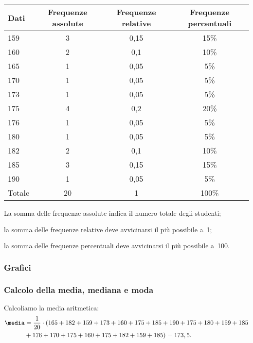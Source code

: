 \begin{esempio}
\begin{center}
\begin{tabular}{lccc}
\toprule
Dati & Frequenze assolute & Frequenze relative & Frequenze percentuali\\
\midrule
159 & 3 & 0,15 & 15\% \\
160 & 2 & 0,1 & 10\% \\
165 & 1 & 0,05 & 5\% \\
170 & 1 & 0,05 & 5\% \\
173 & 1 & 0,05 & 5\% \\
175 & 4 & 0,2 & 20\% \\
176 & 1 & 0,05 & 5\% \\
180 & 1 & 0,05 & 5\% \\
182 & 2 & 0,1 & 10\% \\
185 & 3 & 0,15 & 15\% \\
190 & 1 & 0,05 & 5\% \\
\midrule
Totale & 20 & 1 & 100\% \\
\bottomrule
\end{tabular}
\end{center}
\begin{itemize*}
\item La somma delle frequenze assolute indica il numero totale degli 
studenti;
\item la somma delle frequenze relative deve avvicinarsi il più possibile 
a~1;
\item la somma delle frequenze percentuali deve avvicinarsi il più 
possibile a~100.
\end{itemize*}
\vspace{-24pt}
\subsubsection{Grafici}
\begin{center}
 
\end{center}

\vspace{-24pt}
\subsubsection{Calcolo della media, mediana e moda}

Calcoliamo la media aritmetica:
\begin{equation*}
\begin{split}
\media &= \frac{1}{20} \cdot 
(165+182+159+173+160+175+185+190+175+180+159+185\\
 &+176+170+175+160+175+182+159+185)=173,5.
\end{split}
\end{equation*}


\end{esempio}
